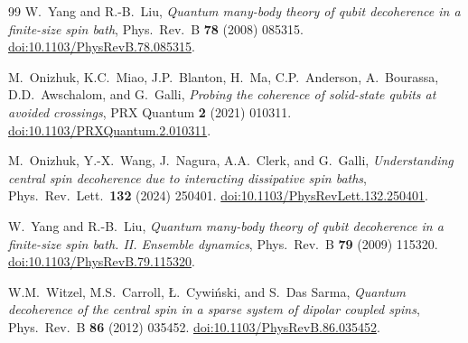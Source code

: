 \documentclass[11pt,a4paper]{article}
\begin{document}
\begin{thebibliography}{99}
W.~Yang and R.-B.~Liu, \emph{Quantum many-body theory of qubit decoherence in a finite-size spin bath}, Phys.~Rev.~B \textbf{78} (2008) 085315. \href{https://doi.org/10.1103/PhysRevB.78.085315}{doi:10.1103/PhysRevB.78.085315}.

M.~Onizhuk, K.C.~Miao, J.P.~Blanton, H.~Ma, C.P.~Anderson, A.~Bourassa, D.D.~Awschalom, and G.~Galli, \emph{Probing the coherence of solid-state qubits at avoided crossings}, PRX Quantum \textbf{2} (2021) 010311. \href{https://doi.org/10.1103/PRXQuantum.2.010311}{doi:10.1103/PRXQuantum.2.010311}.

M.~Onizhuk, Y.-X.~Wang, J.~Nagura, A.A.~Clerk, and G.~Galli, \emph{Understanding central spin decoherence due to interacting dissipative spin baths}, Phys.~Rev.~Lett.\ \textbf{132} (2024) 250401. \href{https://doi.org/10.1103/PhysRevLett.132.250401}{doi:10.1103/PhysRevLett.132.250401}.

W.~Yang and R.-B.~Liu, \emph{Quantum many-body theory of qubit decoherence in a finite-size spin bath. II. Ensemble dynamics}, Phys.~Rev.~B \textbf{79} (2009) 115320. \href{https://doi.org/10.1103/PhysRevB.79.115320}{doi:10.1103/PhysRevB.79.115320}.

W.M.~Witzel, M.S.~Carroll, \L.~Cywi\'nski, and S.~Das Sarma, \emph{Quantum decoherence of the central spin in a sparse system of dipolar coupled spins}, Phys.~Rev.~B \textbf{86} (2012) 035452. \href{https://doi.org/10.1103/PhysRevB.86.035452}{doi:10.1103/PhysRevB.86.035452}.

\end{thebibliography}
\end{document}
